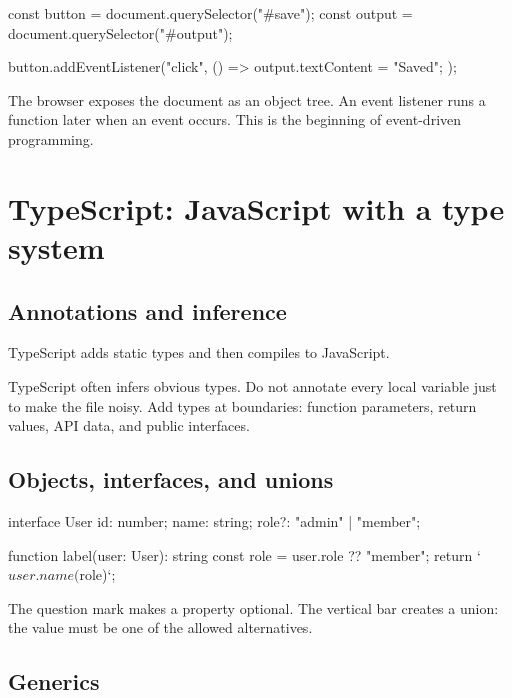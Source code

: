 \documentclass[11pt,openany,oneside]{book}
\begin{document}
\begin{code}[language=JavaScript]
const button = document.querySelector("#save");
const output = document.querySelector("#output");

button.addEventListener("click", () => {
  output.textContent = "Saved";
});
\end{code}

The browser exposes the document as an object tree. An event listener runs a function later when an event occurs. This is the beginning of event-driven programming.

\chapter{TypeScript: JavaScript with a type system}

\section{Annotations and inference}

TypeScript adds static types and then compiles to JavaScript.


TypeScript often infers obvious types. Do not annotate every local variable just to make the file noisy. Add types at boundaries: function parameters, return values, API data, and public interfaces.

\section{Objects, interfaces, and unions}

\begin{code}[language=TypeScript]
interface User {
  id: number;
  name: string;
  role?: "admin" | "member";
}

function label(user: User): string {
  const role = user.role ?? "member";
  return `${user.name} (${role})`;
}
\end{code}

The question mark makes a property optional. The vertical bar creates a union: the value must be one of the allowed alternatives.

\section{Generics}
\end{document}
